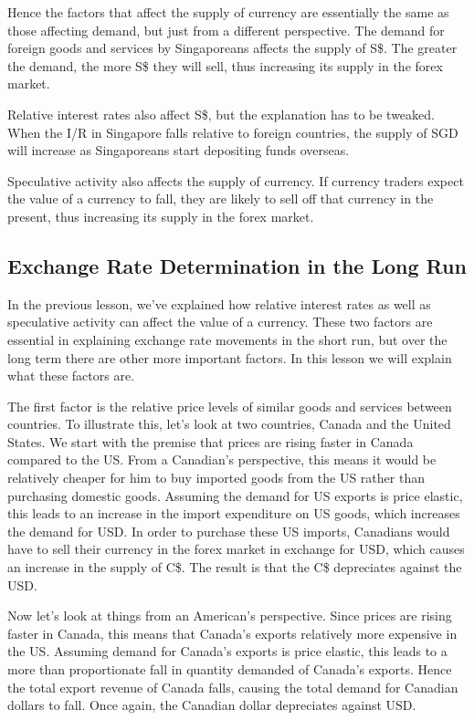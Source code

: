 Hence the factors that affect the supply of currency are essentially the same as those affecting demand, but just from a different perspective. The demand for foreign goods and services by Singaporeans affects the supply of S\$. The greater the demand, the more S\$ they will sell, thus increasing its supply in the forex market.

Relative interest rates also affect S\$, but the explanation has to be tweaked. When the I/R in Singapore falls relative to foreign countries, the supply of SGD will increase as Singaporeans start depositing funds overseas.

Speculative activity also affects the supply of currency. If currency traders expect the value of a currency to fall, they are likely to sell off that currency in the present, thus increasing its supply in the forex market.
\subsection{Exchange Rate Determination in the Long Run}
In the previous lesson, we've explained how relative interest rates as well as speculative activity can affect the value of a currency. These two factors are essential in explaining exchange rate movements in the short run, but over the long term there are other more important factors. In this lesson we will explain what these factors are.

The first factor is the relative price levels of similar goods and services between countries. To illustrate this, let's look at two countries, Canada and the United States. We start with the premise that prices are rising faster in Canada compared to the US. From a Canadian's perspective, this means it would be relatively cheaper for him to buy imported goods from the US rather than purchasing domestic goods. Assuming the demand for US exports is price elastic, this leads to an increase in the import expenditure on US goods, which increases the demand for USD. In order to purchase these US imports, Canadians would have to sell their currency in the forex market in exchange for USD, which causes an increase in the supply of C\$. The result is that the C\$ depreciates against the USD.

Now let's look at things from an American's perspective. Since prices are rising faster in Canada, this means that Canada's exports relatively more expensive in the US. Assuming demand for Canada's exports is price elastic, this leads to a more than proportionate fall in quantity demanded of Canada's exports. Hence the total export revenue of Canada falls, causing the total demand for Canadian dollars to fall. Once again, the Canadian dollar depreciates against USD.

